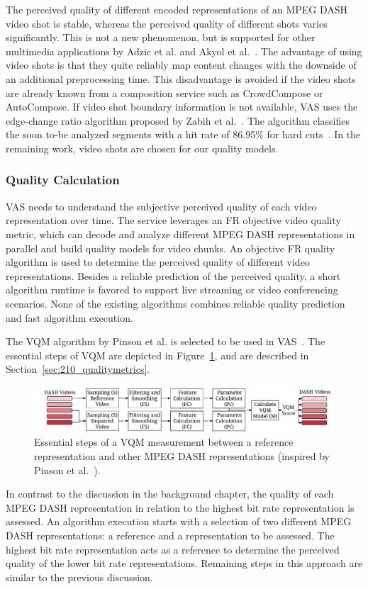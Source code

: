 The perceived quality of different encoded representations of an \ac{MPEG} \ac{DASH} video shot is stable, whereas the perceived quality of different shots varies significantly.
This is not a new phenomenon, but is supported for other multimedia applications by Adzic et al. and Akyol et al.~\cite{Adzic2012,Akyol2007}.
The advantage of using video shots is that they quite reliably map content changes with the downside of an additional preprocessing time.
This disadvantage is avoided if the video shots are already known from a composition service such as CrowdCompose or AutoCompose.
If video shot boundary information is not available,
\ac{VAS} uses the edge-change ratio algorithm proposed by Zabih et al.~\cite{zabih1999}.
The algorithm classifies the soon to-be analyzed segments with a hit rate of 86.95\% for hard cuts~\cite{Lienhart1999}. 
In the remaining work, video shots are chosen for our quality models.
\subsubsection{Quality Calculation}
\label{sec:721_quality_estimation}
\ac{VAS} needs to understand the subjective perceived quality of each video representation over time. 
The service leverages an \ac{FR} objective video quality metric, which can decode and analyze different \ac{MPEG} \ac{DASH} representations in parallel and build quality models for video chunks.
An objective \ac{FR} quality algorithm is used to determine the perceived quality of different video representations. 
Besides a reliable prediction of the perceived quality, a short algorithm runtime is favored to support live streaming or video conferencing scenarios. 
None of the existing algorithms combines reliable quality prediction and fast algorithm execution.

The \ac{VQM} algorithm by Pinson et al. is selected to be used in \ac{VAS}~\cite{Pinson2004}.
The essential steps of \ac{VQM} are depicted in Figure~\ref{fig:720_vqmsteps}, and are described in Section~\ref{sec:210_qualitymetrics}.
\begin{figure}[t]
	\centering
	\includegraphics[width=\textwidth]{./gfx/700_VAS/VQMDash}
	\caption[Essential steps of a VQM assessment for \ac{MPEG} DASH videos]{Essential steps of a VQM measurement between a reference representation and other \ac{MPEG} DASH representations (inspired by Pinson et al.~\cite{Pinson2004}).}
	\label{fig:720_vqmsteps}
\end{figure}
In contrast to the discussion in the background chapter, the quality of each \ac{MPEG} \ac{DASH} representation in relation to the highest bit rate representation is assessed.
An algorithm execution starts with a selection of two different \ac{MPEG} \ac{DASH} representations: a reference and a representation to be assessed.
The highest bit rate representation acts as a reference to determine the perceived quality of the lower bit rate representations.
Remaining steps in this approach are similar to the previous discussion.

